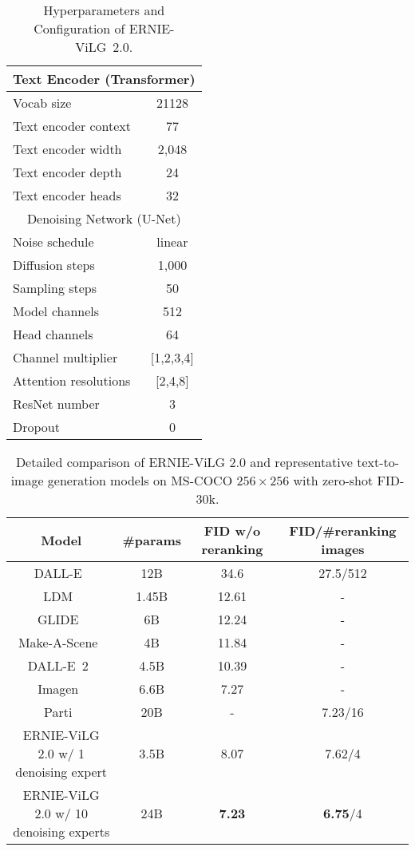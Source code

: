 \documentclass[10pt,twocolumn,letterpaper]{article}
\begin{document}
\begin{table}[t]
  \centering\small
  \caption{Hyperparameters and Configuration of ERNIE-ViLG~2.0.}
    \begin{tabular}{lc}
    \toprule
    \multicolumn{2}{c}{Text Encoder (Transformer)} \\
    \midrule
    Vocab size & 21128 \\
    Text encoder context & 77 \\
    Text encoder width & 2,048 \\
    Text encoder depth & 24 \\
    Text encoder heads & 32 \\
    \bottomrule
    \toprule
    \multicolumn{2}{c}{Denoising Network (U-Net)} \\
    \midrule
    Noise schedule & linear \\
    Diffusion steps & 1,000 \\
    Sampling steps & 50 \\
    Model channels & 512 \\
    Head channels & 64 \\
    Channel multiplier & [1,2,3,4] \\ 
    Attention resolutions & [2,4,8] \\
    ResNet number & 3 \\
    Dropout & 0 \\
    \bottomrule
    \end{tabular}\label{tab:config}\end{table}

\begin{table*}[t]
  \centering\small
  \caption{Detailed comparison of ERNIE-ViLG 2.0 and representative text-to-image generation models on MS-COCO $256 \times 256$ with zero-shot FID-30k.}
    \begin{tabular}{cccc}
    \toprule
    Model & \#params & FID w/o reranking & FID/\#reranking images \\
    \midrule
    DALL-E~\cite{DBLP:conf/icml/RameshPGGVRCS21} & 12B   & 34.6  & 27.5/512 \\
    LDM~\cite{DBLP:journals/corr/abs-2112-10752}  & 1.45B & 12.61 & - \\
    GLIDE~\cite{DBLP:conf/icml/NicholDRSMMSC22}   & 6B    & 12.24 & - \\
    Make-A-Scene~\cite{DBLP:journals/corr/abs-2203-13131} & 4B    & 11.84 & - \\
    DALL-E~2~\cite{DBLP:journals/corr/abs-2204-06125} & 4.5B  & 10.39 & - \\
    Imagen~\cite{DBLP:journals/corr/abs-2205-11487}   & 6.6B  & 7.27  & - \\
    Parti~\cite{DBLP:journals/corr/abs-2206-10789} & 20B   & -     & 7.23/16 \\
    \midrule
    ERNIE-ViLG 2.0 w/ 1 denoising expert & 3.5B  & 8.07  & 7.62/4 \\
    ERNIE-ViLG 2.0 w/ 10 denoising experts & 24B   & \textbf{7.23} &  \textbf{6.75}/4 \\
    \bottomrule
    \end{tabular}

  \label{tab:fid}\end{table*}
\end{document}
